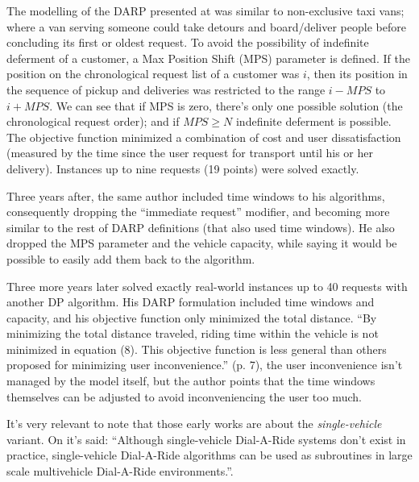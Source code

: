 \documentclass[english,plano-doutorado,twoside]{iiufrgs}
\begin{document}
The modelling of the DARP presented at \cite{psaraftis_dynamic_1980} was similar to non-exclusive taxi vans; where a van serving someone could take detours and board/deliver people before concluding its first or oldest request. To avoid the possibility of indefinite deferment of a customer, a Max Position Shift (MPS) parameter is defined. If the position on the chronological request list of a customer was \(i\), then its position  in the sequence of pickup and deliveries was restricted to the range \(i - MPS\) to \(i + MPS\). We can see that if MPS is zero, there's only one possible solution (the chronological request order); and if \(MPS \geq N\) indefinite deferment is possible. The objective function minimized a combination of cost and user dissatisfaction (measured by the time since the user request for transport until his or her delivery). Instances up to nine requests (19 points) were solved exactly.

Three years after, the same author included time windows to his algorithms\cite{psaraftis_exact_1983}, consequently dropping the ``immediate request'' modifier, and becoming more similar to the rest of DARP definitions (that also used time windows). He also dropped the MPS parameter and the vehicle capacity, while saying it would be possible to easily add them back to the algorithm.

Three more years later \cite{desrosiers_dynamic_1986} solved exactly real-world instances up to 40 requests with another DP algorithm. His DARP formulation included time windows and capacity, and his objective function only minimized the total distance. ``By minimizing the total distance traveled, riding time within the vehicle is not minimized in equation (8). This objective function is less general than others proposed for minimizing user inconvenience.'' (p. 7), the user inconvenience isn't managed by the model itself, but the author points that the time windows themselves can be adjusted to avoid inconveniencing the user too much.

It's very relevant to note that those early works are about the \emph{single-vehicle} variant. On \cite{psaraftis_exact_1983} it's said: ``Although single-vehicle Dial-A-Ride systems don't exist in practice, single-vehicle Dial-A-Ride algorithms can be used as subroutines in large scale multivehicle Dial-A-Ride environments.''.
\end{document}
